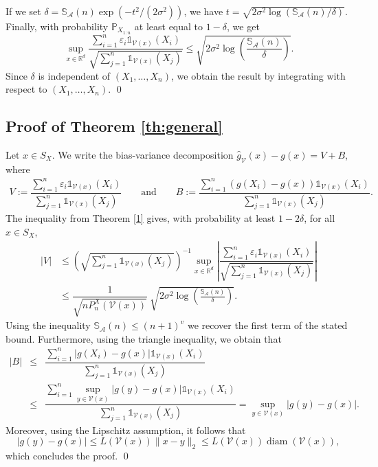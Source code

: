 \documentclass[paper=a4, fontsize=11pt]{scrartcl}
\newcommand{\diam}{\operatorname{diam}}
\newcommand{\pr}{\mathbb{P}}
\begin{document}
   If we set $\delta = \mathbb S_\mathcal A(n) \exp\left( {-t^2} /{(2\sigma^2)}\right)$, we have $t = \sqrt{2\sigma^2 \log\left({\mathbb S_\mathcal A(n)}/{\delta}\right)}$. Finally, with probability $\pr_{X_{1:n}}$ at least equal to $1 - \delta$, we get
$$\sup_{x\in \mathbb R^d} \dfrac{\sum_{i=1}^n \varepsilon_i \mathds 1 _{ \mathcal V(x) }(X_i)}{\sqrt{\sum_{j=1}^n \mathds 1 _{ \mathcal V(x) }(X_j)}}  \leq \sqrt{2 \sigma^2 \log\left( \frac{\mathbb S_{\mathcal A}(n)}{\delta} \right)}.$$
   Since $\delta$ is independent of $(X_1,\ldots,X_n)$, we obtain the result by integrating with respect to $(X_1,\ldots,X_n)$.
\qed 

\subsection*{Proof of Theorem \ref{th:general}}

    Let \(x \in S_X\). We write the bias-variance decomposition 
$\hat g_{\mathcal V}(x) - g(x) = V + B$, where \begin{align*}
    V := \dfrac{\sum_{i=1}^n \varepsilon_i \mathds 1 _{ \mathcal V(x) }(X_i)}{\sum_{j=1}^n \mathds 1 _{ \mathcal V(x) }(X_j)} \qquad \text{and}\qquad
       B := \dfrac{\sum_{i=1}^n \left(g(X_i) - g(x)\right) \mathds 1 _{ \mathcal V(x) }(X_i)}{\sum_{j=1}^n \mathds 1 _{ \mathcal V(x) }(X_j)}.
\end{align*}
The inequality from Theorem \ref{1} gives, with probability at least $1 - 2\delta$, for all $x \in S_X $,
\begin{align*}
    |V| &\leq \left({\sqrt{\sum_{j=1}^n \mathds 1 _{ \mathcal V(x) }(X_j)}} \right)^{-1} \sup_{x\in \mathbb R^d} \left| \dfrac{\sum_{i=1}^n \varepsilon_i \mathds 1 _{ \mathcal V(x) }(X_i)}{\sqrt{\sum_{j=1}^n \mathds 1 _{ \mathcal V(x) }(X_j)}} \right| \\ &\leq \dfrac{1}{\sqrt{n P_n^X(\mathcal{V}(x))}} \ \sqrt{2 \sigma^2 \log\left( \frac{\mathbb S_\mathcal A(n)}{\delta} \right)} .
\end{align*}
Using the inequality $\mathbb S_\mathcal A(n) \leq (n+1)^v$ we recover the first term of the stated bound. Furthermore, using the triangle inequality, we obtain that
\begin{eqnarray*}
    |B| &\leq& \dfrac{\sum_{i=1}^n \left|g(X_i) - g(x)\right| \mathds 1 _{ \mathcal V(x) }(X_i)}{\sum_{j=1}^n \mathds 1 _{ \mathcal V(x) }(X_j)} \\ &\leq& \dfrac{\sum_{i=1}^n \sup_{y \in \mathcal V(x)} |g(y) - g(x)| \mathds 1 _{ \mathcal V(x) }(X_i)}{\sum_{j=1}^n \mathds 1 _{ \mathcal V(x) }(X_j)} = \sup_{y \in \mathcal V(x)} |g(y) - g(x)|.
\end{eqnarray*}
Moreover, using the Lipschitz assumption, it follows that
$$|g(y) - g(x)| \leq  L(\mathcal V(x)) \|x-y\|_2  \leq L(\mathcal V(x)) \diam  (\mathcal V(x) ) , $$
which concludes the proof.
\qed
\end{document}
